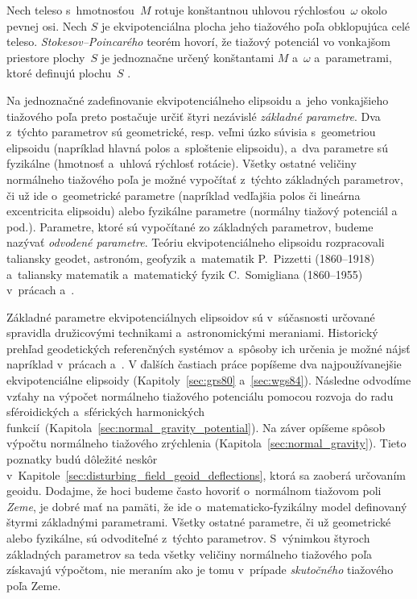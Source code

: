\documentclass[a4paper,12pt]{book}
\begin{document}
Nech teleso s~hmotnosťou~$M$ rotuje konštantnou uhlovou rýchlosťou~$\omega$ 
okolo pevnej osi.  Nech $S$ je ekvipotenciálna plocha jeho tiažového poľa 
obklopujúca celé teleso.  \emph{Stokesov--Poincarého} teorém hovorí, že tiažový 
potenciál vo vonkajšom priestore plochy~$S$ je jednoznačne určený konštantami 
$M$ a~$\omega$ a~parametrami, ktoré definujú plochu~$S$ 
\parencite{TorgeGeodesy}.

Na jednoznačné zadefinovanie ekvipotenciálneho elipsoidu a~jeho vonkajšieho 
tiažového poľa preto postačuje určiť štyri nezávislé \emph{základné parametre}.  
Dva z~týchto parametrov sú geometrické, resp. veľmi úzko súvisia s~geometriou 
elipsoidu (napríklad hlavná polos a~sploštenie elipsoidu), a~dva parametre sú 
fyzikálne (hmotnosť a~uhlová rýchlosť rotácie).  Všetky ostatné veličiny 
normálneho tiažového poľa je možné vypočítať z~týchto základných parametrov, či 
už ide o~geometrické parametre (napríklad vedľajšia polos či lineárna 
excentricita elipsoidu) alebo fyzikálne parametre (normálny tiažový potenciál 
a pod.).  Parametre, ktoré sú vypočítané zo základných parametrov, budeme 
nazývať \emph{odvodené parametre}.  Teóriu ekvipotenciálneho elipsoidu 
rozpracovali taliansky geodet, astronóm, geofyzik a~matematik P.~Pizzetti 
(1860--1918) a~taliansky matematik a~matematický fyzik C.~Somigliana 
(1860--1955) v~prácach \textcite{Pizzetti1984} a~\textcite{Somigliana1929}.

Základné parametre ekvipotenciálnych elipsoidov sú v~súčasnosti určované 
spravidla družicovými technikami a~astronomickými meraniami.  Historický 
prehľad geodetických referenčných systémov a~spôsoby ich určenia je možné nájsť 
napríklad v~prácach \textcite{TorgeGeodesy} a~\textcite{MoritzPhysicalGeodesy}.  
V ďalších častiach práce popíšeme dva najpoužívanejšie ekvipotenciálne 
elipsoidy (Kapitoly~\ref{sec:grs80} a~\ref{sec:wgs84}).  Následne odvodíme 
vzťahy na výpočet normálneho tiažového potenciálu pomocou rozvoja do radu 
sféroidických a~sférických harmonických 
funkcií~(Kapitola~\ref{sec:normal_gravity_potential}).  Na záver opíšeme spôsob 
výpočtu normálneho tiažového zrýchlenia (Kapitola~\ref{sec:normal_gravity}).  
Tieto poznatky budú dôležité neskôr 
v~Kapitole~\ref{sec:disturbing_field_geoid_deflections}, ktorá sa zaoberá 
určovaním geoidu.  Dodajme, že hoci budeme často hovoriť o~normálnom tiažovom 
poli \emph{Zeme}, je dobré mať na pamäti, že ide o~matematicko-fyzikálny model 
definovaný štyrmi základnými parametrami.  Všetky ostatné parametre, či už 
geometrické alebo fyzikálne, sú odvoditeľné z~týchto parametrov.  S~výnimkou 
štyroch základných parametrov sa teda všetky veličiny normálneho tiažového poľa 
získavajú výpočtom, nie meraním ako je tomu v~prípade \emph{skutočného} 
tiažového poľa Zeme.
\end{document}
